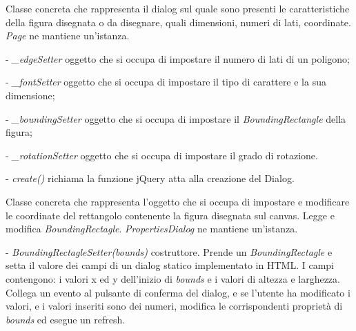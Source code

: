 Classe concreta che rappresenta il dialog sul quale sono presenti le caratteristiche della figura disegnata o da disegnare, quali dimensioni, numeri di lati, coordinate.
\textit{Page} ne mantiene un'istanza.
\begin{elencopuntato}[\subsubsecindent]
\item[-] \textit{{\_}edgeSetter} oggetto che si occupa di impostare il numero di lati di un poligono;
\item[-] \textit{{\_}fontSetter} oggetto che si occupa di impostare il tipo di carattere e la sua dimensione;
\item[-] \textit{{\_}boundingSetter} oggetto che si occupa di impostare il \textit{BoundingRectangle} della figura;
\item[-] \textit{{\_}rotationSetter} oggetto che si occupa di impostare il grado di rotazione.
\end{elencopuntato}
\begin{elencopuntato}[\subsubsecindent]
\item[-] \textit{create()} richiama la funzione jQuery atta alla creazione del Dialog.
\end{elencopuntato}

Classe concreta che rappresenta l'oggetto che si occupa di impostare e modificare le coordinate del rettangolo contenente la figura disegnata sul canvas.
Legge e modifica \textit{BoundingRectagle}.
\textit{PropertiesDialog} ne mantiene un'istanza.
\begin{elencopuntato}[\subsubsecindent]
\item[-] \textit{BoundingRectagleSetter(bounds)} costruttore. Prende un \textit{BoundingRectagle} e setta il valore dei campi di un dialog statico implementato in HTML. I campi contengono: i valori x ed y dell'inizio di \textit{bounds} e i valori di altezza e larghezza. Collega un evento al pulsante di conferma del dialog, e se l'utente ha modificato i valori, e i valori inseriti sono dei numeri, modifica le corrispondenti propriet\`a di \textit{bounds} ed esegue un refresh.
\end{elencopuntato}

